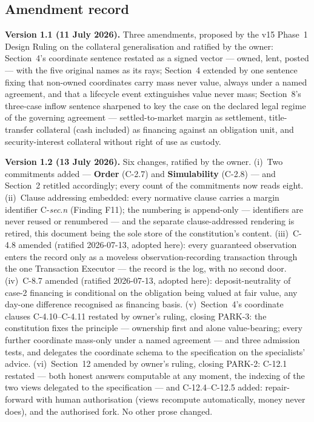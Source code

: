 \documentclass[11pt,a4paper]{article}
\begin{document}
\subsection*{Amendment record}

\textbf{Version 1.1 (11 July 2026).} Three amendments, proposed by the
v15 Phase~1 Design Ruling on the collateral generalisation and ratified
by the owner: Section~4's coordinate sentence restated as a signed
vector --- owned, lent, posted --- with the five original names as its
rays; Section~4 extended by one sentence fixing that non-owned
coordinates carry mass never value, always under a named agreement, and
that a lifecycle event extinguishes value never mass; Section~8's
three-case inflow sentence sharpened to key the case on the declared
legal regime of the governing agreement --- settled-to-market margin as
settlement, title-transfer collateral (cash included) as financing
against an obligation unit, and security-interest collateral without
right of use as custody.

\textbf{Version 1.2 (13 July 2026).} Six changes, ratified by the
owner. (i)~Two commitments added --- \textbf{Order} (C-2.7) and
\textbf{Simulability} (C-2.8) --- and Section~2 retitled accordingly;
every count of the commitments now reads eight. (ii)~Clause addressing
embedded: every normative clause carries a margin identifier
C-\emph{sec}.\emph{n} (Finding F11); the numbering is append-only ---
identifiers are never reused or renumbered --- and the separate
clause-addressed rendering is retired, this document being the sole
store of the constitution's content. (iii)~C-4.8 amended (ratified
2026-07-13, adopted here): every guaranteed observation enters the
record only as a moveless observation-recording transaction through the
one Transaction Executor --- the record is the log, with no second
door. (iv)~C-8.7 amended (ratified 2026-07-13, adopted here):
deposit-neutrality of case-2 financing is conditional on the obligation
being valued at fair value, any day-one difference recognised as
financing basis. (v)~Section~4's coordinate clauses C-4.10--C-4.11
restated by owner's ruling, closing PARK-3: the constitution fixes the
principle --- ownership first and alone value-bearing; every further
coordinate mass-only under a named agreement --- and three admission
tests, and delegates the coordinate schema to the specification on the
specialists' advice. (vi)~Section~12 amended by owner's ruling, closing
PARK-2: C-12.1 restated --- both honest answers computable at any
moment, the indexing of the two views delegated to the specification
--- and C-12.4--C-12.5 added: repair-forward with human authorisation
(views recompute automatically, money never does), and the authorised
fork. No other prose changed.
\end{document}
